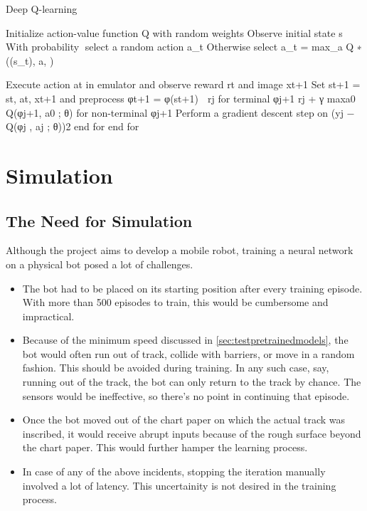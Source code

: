 \documentclass[12pt]{extreport}
\begin{document}
\begin{algorithm}
\caption{Deep Q-learning}\label{euclid}
\begin{algorithmic}[1]
\State Initialize action-value function Q with random weights
\State Observe initial state s
		\State With probability select a random action a_t
		\State Otherwise select
		\State a_t = max_a Q ∗ (\phi(s_t), a, \theta)
	\EndFor
\EndFor
\end{algorithmic}
\end{algorithm}




Execute action at in emulator and observe reward rt and image xt+1
Set st+1 = st, at, xt+1 and preprocess φt+1 = φ(st+1)

rj for terminal φj+1
rj + γ maxa0 Q(φj+1, a0
; θ) for non-terminal φj+1
Perform a gradient descent step on (yj − Q(φj , aj ; θ))2
end for
end for

\chapter{Simulation} \label{ch:simulation}


\section{The Need for Simulation}

Although the project aims to develop a mobile robot, training a neural network on a physical bot posed a lot of challenges.

\begin{itemize}
   \item The bot had to be placed on its starting position after every training episode. With more than 500 episodes to train, this would be cumbersome and impractical.
   \item Because of the minimum speed discussed in \autoref{sec:testpretrainedmodels}, the bot would often run out of track, collide with barriers, or move in a random fashion. This should be avoided during training. In any such case, say, running out of the track, the bot can only return to the track by chance. The sensors would be ineffective, so there's no point in continuing that episode.
   \item Once the bot moved out of the chart paper on which the actual track was inscribed, it would receive abrupt inputs because of the rough surface beyond the chart paper. This would further hamper the learning process.
   \item In case of any of the above incidents, stopping the iteration manually involved a lot of latency. This uncertainity is not desired in the training process.
\end{itemize}
\end{document}
